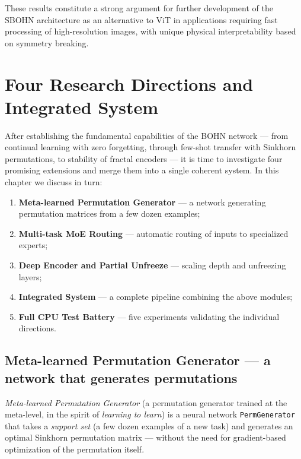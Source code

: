 \documentclass[11pt,a4paper]{report}
\begin{document}
These results constitute a strong argument for further development of the SBOHN architecture as an alternative to ViT in applications requiring fast processing of high-resolution images, with unique physical interpretability based on symmetry breaking.




\chapter{Four Research Directions and Integrated System}

After establishing the fundamental capabilities of the BOHN network --- from continual learning with zero forgetting,
through few-shot transfer with Sinkhorn permutations, to stability of fractal encoders ---
it is time to investigate four promising extensions and merge them into a single coherent system.
In this chapter we discuss in turn:
\begin{enumerate}
    \item \textbf{Meta-learned Permutation Generator} --- a network generating permutation matrices from a few dozen examples;
    \item \textbf{Multi-task MoE Routing} --- automatic routing of inputs to specialized experts;
    \item \textbf{Deep Encoder and Partial Unfreeze} --- scaling depth and unfreezing layers;
    \item \textbf{Integrated System} --- a complete pipeline combining the above modules;
    \item \textbf{Full CPU Test Battery} --- five experiments validating the individual directions.
\end{enumerate}

\section{Meta-learned Permutation Generator --- a network that generates permutations}

\emph{Meta-learned Permutation Generator} (a permutation generator trained at the meta-level,
in the spirit of \emph{learning to learn}) is a neural network \texttt{PermGenerator}
that takes a \emph{support set} (a few dozen examples of a new task)
and generates an optimal Sinkhorn permutation matrix --- without the need for gradient-based optimization
of the permutation itself.
\end{document}
